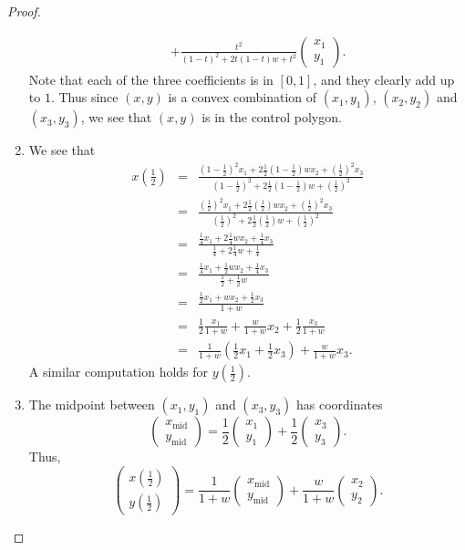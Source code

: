 \begin{proof}
\begin{enumerate}
\begin{eqnarray*}
    & & + \frac{t^2}{(1-t)^2 + 2t(1-t)w + t^2}\left(\begin{array}{c} x_1\\ y_1 \end{array}\right).
\end{eqnarray*}
Note that each of the three coefficients is in $[0,1]$, and they clearly add up to $1$. Thus since $(x,y)$ is a convex combination of $(x_1,y_1)$, $(x_2,y_2)$ and $(x_3,y_3)$, we see that $(x,y)$ is in the control polygon.
\item We see that
\begin{eqnarray*}
   x\left(\frac{1}{2}\right)
   & = & \frac{\left(1-\frac{1}{2}\right)^2 x_1 + 2\frac{1}{2}\left(1-\frac{1}{2}\right)wx_2 + \left(\frac{1}{2}\right)^2 x_3}{\left(1-\frac{1}{2}\right)^2 + 2\frac{1}{2}\left(1-\frac{1}{2}\right)w + \left(\frac{1}{2}\right)^2}\\
   & = & \frac{\left(\frac{1}{2}\right)^2 x_1 + 2\frac{1}{2}\left(\frac{1}{2}\right)wx_2 + \left(\frac{1}{2}\right)^2 x_3}{\left(\frac{1}{2}\right)^2 + 2\frac{1}{2}\left(\frac{1}{2}\right)w + \left(\frac{1}{2}\right)^2}\\
   & = & \frac{\frac{1}{4} x_1 + 2\frac{1}{4}wx_2 + \frac{1}{4} x_3}{\frac{1}{4} + 2\frac{1}{4}w + \frac{1}{4}}\\
   & = & \frac{\frac{1}{4} x_1 + \frac{1}{2}wx_2 + \frac{1}{4} x_3}{\frac{1}{2} + \frac{1}{2}w}\\
   & = & \frac{\frac{1}{2} x_1 + wx_2 + \frac{1}{2} x_3}{1+w}\\
   & = & \frac{1}{2}\frac{x_1}{1+w} + \frac{w}{1+w}x_2 + \frac{1}{2}\frac{x_3}{1+w}\\
   & = & \frac{1}{1+w}\left(\frac{1}{2}x_1 + \frac{1}{2}x_3\right) + \frac{w}{1+w}x_3.
\end{eqnarray*}
A similar computation holds for $y\left(\frac{1}{2}\right)$.
    \item The midpoint between $(x_1,y_1)$ and $(x_3,y_3)$ has coordinates 
    $$\left(\begin{array}{c}x_{\text{mid}}\\ y_{\text{mid}}\end{array}\right) = \frac{1}{2}\left(\begin{array}{c}x_1\\ y_1\end{array}\right) + \frac{1}{2}\left(\begin{array}{c}x_3\\ y_3\end{array}\right).$$
    Thus,
    $$\left(\begin{array}{c}x\left(\frac{1}{2}\right)\\ y\left(\frac{1}{2}\right)\end{array}\right) = \frac{1}{1+w}\left(\begin{array}{c}x_{\text{mid}}\\ y_{\text{mid}}\end{array}\right) + \frac{w}{1+w}\left(\begin{array}{c}x_2\\ y_2\end{array}\right).$$

\end{enumerate}
\end{proof}
